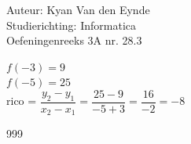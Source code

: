 \documentclass[a4paper]{article}
\begin{document}
  
\noindent \large Auteur: Kyan Van den Eynde \\
\noindent \large Studierichting: Informatica\\
\noindent \large Oefeningenreeks 3A nr. 28.3\\

\medskip

\normalsize

$f(-3) = 9$\\

$f(-5) = 25$\\

rico = $\dfrac{y_2-y_1}{x_2-x_1} = \dfrac{25-9}{-5+3} = \dfrac{16}{-2} = -8$\\

\begin{thebibliography}{999}
\end{thebibliography}
\end{document}
